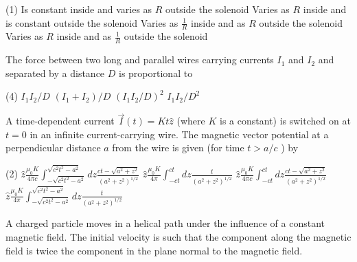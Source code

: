 \begin{enumerate}
\begin{minipage}{\textwidth}
\end{minipage}
\begin{tasks}(1)
	\task[\textbf{A.}]Is constant inside and varies as $R$ outside the solenoid
	\task[\textbf{B.}]Varies as $R$ inside and is constant outside the solenoid
	\task[\textbf{C.}]Varies as $\frac{1}{R}$ inside and as $R$ outside the solenoid
	\task[\textbf{D.}]Varies as $R$ inside and as $\frac{1}{R}$ outside the solenoid
\end{tasks}
\begin{minipage}{\textwidth}
	\item The force between two long and parallel wires carrying currents $I_{1}$ and $I_{2}$ and separated by a distance $D$ is proportional to
\end{minipage}
\begin{tasks}(4)
	\task[\textbf{A.}] $I_{1} I_{2} / D$
	\task[\textbf{B.}]$\left(I_{1}+I_{2}\right) / D$
	\task[\textbf{C.}]$\left(I_{1} I_{2} / D\right)^{2}$
	\task[\textbf{D.}]$I_{1} I_{2} / D^{2}$
\end{tasks}
\begin{minipage}{\textwidth}
	\item A time-dependent current $\vec{I}(t)=K t \hat{z}$ (where $K$ is a constant) is switched on at $t=0$ in an infinite current-carrying wire. The magnetic vector potential at a perpendicular distance $a$ from the wire is given (for time $t>a / c$ ) by
\end{minipage}
\begin{tasks}(2)
	\task[\textbf{A.}] $\hat{z} \frac{\mu_{0} K}{4 \pi c} \int_{-\sqrt{c^{2} t^{2}-a^{2}}}^{\sqrt{c^{2} t^{2}-a^{2}}} d z \frac{c t-\sqrt{a^{2}+z^{2}}}{\left(a^{2}+z^{2}\right)^{1 / 2}}$
	\task[\textbf{B.}] $\hat{z} \frac{\mu_{0} K}{4 \pi} \int_{-c t}^{c t} d z \frac{t}{\left(a^{2}+z^{2}\right)^{1 / 2}}$
	\task[\textbf{C.}] $\hat{z} \frac{\mu_{0} K}{4 \pi c} \int_{-c t}^{c t} d z \frac{c t-\sqrt{a^{2}+z^{2}}}{\left(a^{2}+z^{2}\right)^{1 / 2}}$
	\task[\textbf{D.}] $\hat{z} \frac{\mu_{0} K}{4 \pi} \int_{-\sqrt{c^{2} t^{2}-a^{2}}}^{\sqrt{c^{2} t^{2}-a^{2}}} d z \frac{t}{\left(a^{2}+z^{2}\right)^{1 / 2}}$
\end{tasks}
\begin{minipage}{\textwidth}
	\item A charged particle moves in a helical path under the influence of a constant magnetic field. The initial velocity is such that the component along the magnetic field is twice the component in the plane normal to the magnetic field.

\end{minipage}
\end{enumerate}
